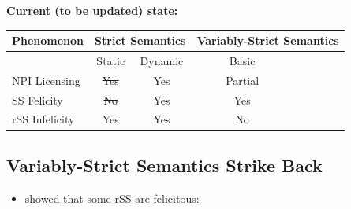 \begin{frame}[t]
\sectionpage\vskip 9pt\textbf{\huge Current (to be updated) state:}\vskip 18pt
\begin{table}[]
    \centering
    \begin{tabular}{l||cc|ccc}
    Phenomenon  &    \multicolumn{2}{|c|}{Strict Semantics}    &  \multicolumn{3}{|c}{Variably-Strict Semantics}\\\hline\hline
                            &   \sout{Static}  & Dynamic    &   Basic    &     &    \\\hline
    \color{Gray}NPI Licensing           &   \sout{\color{Gray}Yes}     &  \color{Gray}Yes      &   \color{Gray}Partial   &      &   \\
    SS Felicity     &   \sout{No}      &  Yes      &   Yes     &        &   \\
    rSS Infelicity    &   \sout{Yes}      &   Yes      &   {No}     &        & 
    \end{tabular}
\end{table}
\end{frame}


\subsection{Variably-Strict Semantics Strike Back}
\begin{frame}[t]
	\sectionpage\vskip 9pt
	\vskip 18pt
	\begin{itemize}
		\item   \citet{Moss2012} showed that some rSS are felicitous:
	\end{itemize}\vskip 18pt
\end{frame}


